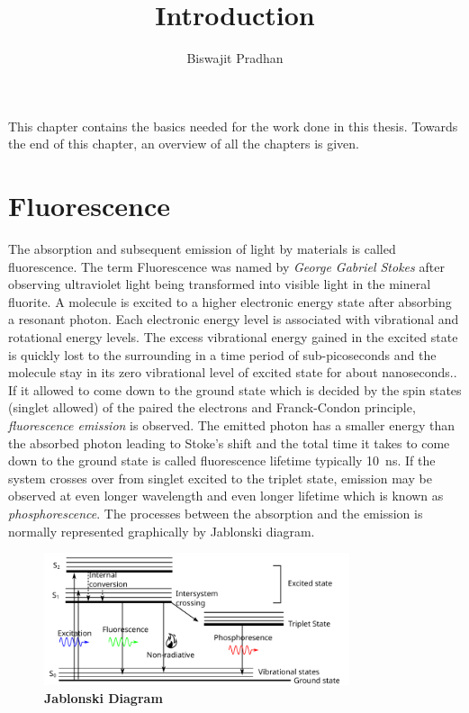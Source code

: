 \documentclass[11pt,a4paper,onecolumn]{article}
\begin{document}
\title{\textbf{Introduction}}
\author{Biswajit Pradhan}
\maketitle
This chapter contains the basics needed for the work done in this thesis.
Towards the end of this chapter, an overview of all the chapters is given.
\section{Fluorescence}
The absorption and subsequent emission of light by materials is called fluorescence.
The term Fluorescence was named by \textit{George Gabriel Stokes} after observing ultraviolet light being transformed into visible light in the mineral fluorite.\cite{Stokes1852}
A molecule is excited to a higher electronic energy state after absorbing a resonant photon.
Each electronic energy level is associated with vibrational and rotational energy levels.
The excess vibrational energy gained in the excited state is quickly lost to the surrounding in a time period of sub-picoseconds and the molecule stay in its zero vibrational level of excited state for about nanoseconds..
If it allowed to come down to the ground state which is decided by the spin states (singlet allowed) of the paired the electrons and Franck-Condon principle, \textit{fluorescence emission} is observed.
The emitted photon has a smaller energy than the absorbed photon leading to Stoke's shift and the total time it takes to come down to the ground state is called fluorescence lifetime typically \SI{10}{\ns}.
If the system crosses over from singlet excited to the triplet state, emission may be observed at even longer wavelength and even longer lifetime which is known as \textit{phosphorescence}.
The processes between the absorption and the emission is normally represented graphically by Jablonski diagram.
\begin{figure}
	\centering
	\includegraphics[width=0.8\textwidth]{jablonski}
	\caption{\textbf{Jablonski Diagram}}
	\label{fig:jablonski}
\end{figure}
\end{document}
